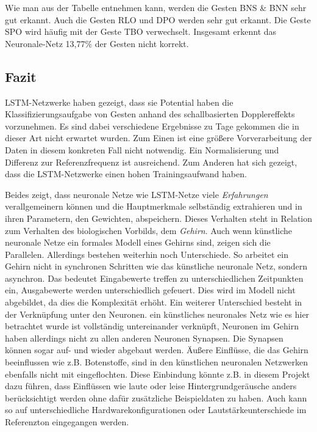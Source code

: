 Wie man aus der Tabelle entnehmen kann, werden die Gesten \ac{BNS} \& \ac{BNN} sehr gut erkannt. 
Auch die Gesten \ac{RLO} und \ac{DPO} werden sehr gut erkannt. Die Geste \ac{SPO} 
wird häufig mit der Geste \ac{TBO} verwechselt.
Insgesamt erkennt das Neuronale-Netz 13,77\% der Gesten nicht korrekt. 



\subsection{Fazit}
\ac{LSTM}-Netzwerke haben gezeigt, dass sie Potential haben die
Klassifizierungsaufgabe von Gesten anhand des schallbasierten Dopplereffekts
vorzunehmen. Es sind dabei verschiedene Ergebnisse zu Tage gekommen die in dieser
Art nicht erwartet wurden. Zum Einen ist eine größere Vorverarbeitung der
Daten in diesem konkreten Fall nicht notwendig. Ein Normalisierung und Differenz
zur Referenzfrequenz ist ausreichend. Zum Anderen hat sich gezeigt, dass die
\ac{LSTM}-Netzwerke einen hohen Trainingsaufwand haben. 

Beides zeigt, dass neuronale Netze wie \ac{LSTM}-Netze viele
\textit{Erfahrungen} verallgemeinern können und die Hauptmerkmale selbständig
extrahieren und in ihren Parametern, den Gewichten, abspeichern. Dieses
Verhalten steht in Relation zum Verhalten des biologischen Vorbilds, dem
\textit{Gehirn}. Auch wenn künstliche neuronale Netze ein formales Modell eines
Gehirns sind, zeigen sich die Parallelen. Allerdings bestehen weiterhin noch
Unterschiede. So arbeitet ein Gehirn nicht in synchronen Schritten wie das
künstliche neuronale Netz, sondern asynchron. Das bedeutet Eingabewerte treffen
zu unterschiedlichen Zeitpunkten ein, Ausgabewerte werden unterschiedlich
gefeuert. Dies wird im Modell nicht abgebildet, da dies die Komplexität erhöht.
Ein weiterer Unterschied besteht in der Verknüpfung unter den Neuronen. ein
künstliches neuronales Netz wie es hier betrachtet wurde ist vollständig
untereinander verknüpft, Neuronen im Gehirn haben allerdings nicht zu allen
anderen Neuronen Synapsen. Die Synapsen können sogar auf- und wieder abgebaut
werden. Äußere Einflüsse, die das Gehirn beeinflussen wie z.B. Botenstoffe, sind
in den künstlichen neuronalen Netzwerken ebenfalls nicht mit eingeflochten.
Diese Einbindung könnte z.B. in diesem Projekt dazu führen, dass Einflüssen wie
laute oder leise Hintergrundgeräusche anders berücksichtigt werden ohne dafür
zusätzliche Beispieldaten zu haben. Auch kann so auf unterschiedliche
Hardwarekonfigurationen oder Lautstärkeunterschiede im Referenzton eingegangen
werden.
 
